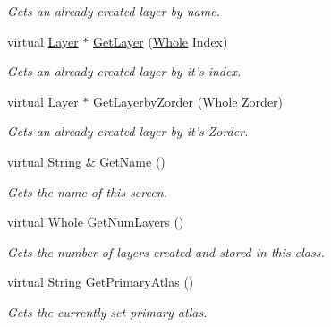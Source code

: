 \begin{DoxyCompactItemize}
\begin{DoxyCompactList}\small\item\em Gets an already created layer by name. \item\end{DoxyCompactList}\item 
virtual \hyperlink{classMezzanine_1_1UI_1_1Layer}{Layer} $\ast$ \hyperlink{classMezzanine_1_1UI_1_1Screen_af37dcc72cefce4dc605a918ce9e23d5e}{GetLayer} (\hyperlink{namespaceMezzanine_adcbb6ce6d1eb4379d109e51171e2e493}{Whole} Index)
\begin{DoxyCompactList}\small\item\em Gets an already created layer by it's index. \item\end{DoxyCompactList}\item 
virtual \hyperlink{classMezzanine_1_1UI_1_1Layer}{Layer} $\ast$ \hyperlink{classMezzanine_1_1UI_1_1Screen_afb19dd4e688a1ccc89f606306895015b}{GetLayerbyZorder} (\hyperlink{namespaceMezzanine_adcbb6ce6d1eb4379d109e51171e2e493}{Whole} Zorder)
\begin{DoxyCompactList}\small\item\em Gets an already created layer by it's Zorder. \item\end{DoxyCompactList}\item 
virtual \hyperlink{namespaceMezzanine_acf9fcc130e6ebf08e3d8491aebcf1c86}{String} \& \hyperlink{classMezzanine_1_1UI_1_1Screen_a5f1f23c666513a658e7297a0bea49629}{GetName} ()
\begin{DoxyCompactList}\small\item\em Gets the name of this screen. \item\end{DoxyCompactList}\item 
virtual \hyperlink{namespaceMezzanine_adcbb6ce6d1eb4379d109e51171e2e493}{Whole} \hyperlink{classMezzanine_1_1UI_1_1Screen_aa76a0066086f4d4b1968cfb18ddcb96c}{GetNumLayers} ()
\begin{DoxyCompactList}\small\item\em Gets the number of layers created and stored in this class. \item\end{DoxyCompactList}\item 
virtual \hyperlink{namespaceMezzanine_acf9fcc130e6ebf08e3d8491aebcf1c86}{String} \hyperlink{classMezzanine_1_1UI_1_1Screen_adafbc28919ebb4d2d65e54daa0676177}{GetPrimaryAtlas} ()
\begin{DoxyCompactList}\small\item\em Gets the currently set primary atlas. \item\end{DoxyCompactList}\item 

\end{DoxyCompactItemize}
